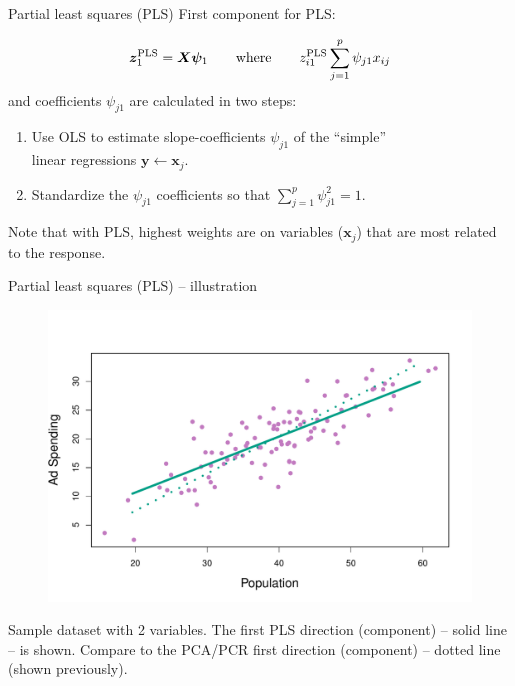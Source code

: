 \documentclass{beamer}
\begin{document}
\begin{frame}{Partial least squares (PLS)}
First component for PLS:

$$ \bm{z}_1^{\textnormal{PLS}} = \bm{X\psi}_1 \qquad \textnormal{where} \qquad 
z_{i1}^{\textnormal{PLS}} \sum_{j=1}^p \psi_{j1} x_{ij}$$
\medskip
and coefficients $\psi_{j1}$ are calculated in two steps:
\begin{enumerate}
\item Use OLS to estimate slope-coefficients $\psi_{j1}$ of the ``simple'' \\linear regressions $\bm{y} \leftarrow \bm{x}_j$.\\
\medskip
\item Standardize the $\psi_{j1}$ coefficients so that $\sum_{j=1}^p \psi_{j1}^2=1$.
\end{enumerate}
\bigskip
Note that with PLS, highest weights are on variables ($\bm{x}_j$) that are most related to the response. 
\end{frame}
\begin{frame}{Partial least squares (PLS) -- illustration}
\vspace{-1.2cm}
\begin{figure}
\includegraphics[scale=0.50]{IMG/PCAExample5.pdf}
\end{figure}
\vspace{-0.6cm}
\centering Sample dataset with 2 variables. The first PLS direction (component) -- solid line -- is shown. Compare to the PCA/PCR first direction (component) -- dotted line (shown previously).
\end{frame}
\end{document}
